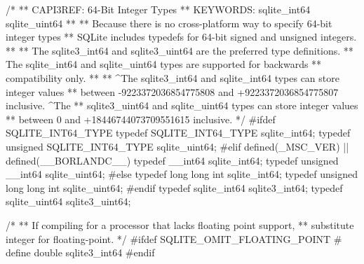 \begin{Codex}[label=sqlite3.h,numbers=left]
{/*
** CAPI3REF: 64-Bit Integer Types
** KEYWORDS: sqlite_int64 sqlite_uint64
**
** Because there is no cross-platform way to specify 64-bit integer types
** SQLite includes typedefs for 64-bit signed and unsigned integers.
**
** The sqlite3_int64 and sqlite3_uint64 are the preferred type definitions.
** The sqlite_int64 and sqlite_uint64 types are supported for backwards
** compatibility only.
**
** ^The sqlite3_int64 and sqlite_int64 types can store integer values
** between -9223372036854775808 and +9223372036854775807 inclusive.  ^The
** sqlite3_uint64 and sqlite_uint64 types can store integer values 
** between 0 and +18446744073709551615 inclusive.
*/
#ifdef SQLITE_INT64_TYPE
  typedef SQLITE_INT64_TYPE sqlite_int64;
  typedef unsigned SQLITE_INT64_TYPE sqlite_uint64;
#elif defined(_MSC_VER) || defined(__BORLANDC__)
  typedef __int64 sqlite_int64;
  typedef unsigned __int64 sqlite_uint64;
#else
  typedef long long int sqlite_int64;
  typedef unsigned long long int sqlite_uint64;
#endif
typedef sqlite_int64 sqlite3_int64;
typedef sqlite_uint64 sqlite3_uint64;

/*
** If compiling for a processor that lacks floating point support,
** substitute integer for floating-point.
*/
#ifdef SQLITE_OMIT_FLOATING_POINT
# define double sqlite3_int64
#endif

}
\end{Codex}

